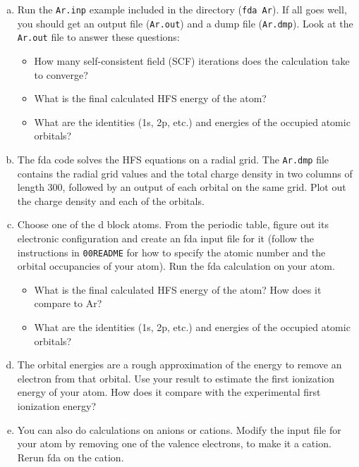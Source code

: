 \documentclass[11pt]{article}
\begin{document}
\begin{enumerate}[(a)]
\item Run the \texttt{Ar.inp} example included in the directory (\verb~fda Ar~). If all goes well, you should get an output file (\texttt{Ar.out}) and a dump file (\texttt{Ar.dmp}). Look at the \texttt{Ar.out} file to answer these questions:

\begin{itemize}
\item How many self-consistent field (SCF) iterations does the calculation take to converge?

\item What is the final calculated HFS energy of the atom?

\item What are the identities (1s, 2p, etc.) and energies of the occupied atomic orbitals?
\end{itemize}

\item The fda code solves the HFS equations on a radial grid. The \texttt{Ar.dmp} file contains the radial grid values and the total charge density in two columns of length 300, followed by an output of each orbital on the same grid. Plot out the charge density and each of the orbitals.

\item Choose one of the d block atoms. From the periodic table, figure out its electronic configuration and create an fda input file for it (follow the instructions in \texttt{00README} for how to specify the atomic number and the orbital occupancies of your atom). Run the fda calculation on your atom.

\begin{itemize}
\item What is the final calculated HFS energy of the atom? How does it compare to Ar?

\item What are the identities (1s, 2p, etc.) and energies of the occupied atomic orbitals?
\end{itemize}

\item The orbital energies are a rough approximation of the energy to remove an electron from that orbital. Use your result to estimate the first ionization energy of your atom. How does it compare with the experimental first ionization energy?

\item You can also do calculations on anions or cations. Modify the input file for your atom by removing one of the valence electrons, to make it a cation. Rerun fda on the cation. 


\end{enumerate}
\end{document}
